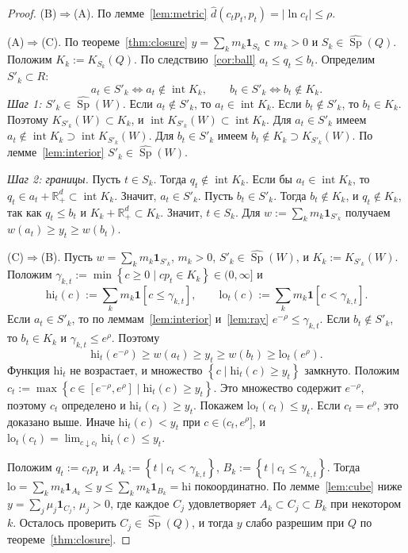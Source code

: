 \documentclass[a4paper,11pt]{article}
\theoremstyle{plain}
\theoremstyle{definition}
\theoremstyle{remark}
\newcommand{\R}{\mathbb{R}}
\newcommand{\abs}[1]{\left\lvert #1 \right\rvert}
\newcommand{\set}[1]{\left\{ #1 \right\}}
\newcommand{\Rp}[1][2]{\R^{#1}_{+}}   %
\DeclareMathOperator{\Sp}{Sp}
\DeclareMathOperator{\interior}{int}
\newcommand{\dd}{\widehat d}
\begin{document}
\begin{proof}
    (B)$\Rightarrow$(A). По лемме~\ref{lem:metric} $\dd(c_tp_t,p_t)=\abs{\ln c_t}\le\rho$.

    (A)$\Rightarrow$(C). По теореме~\ref{thm:closure} $y=\sum_km_k\mathbf 1_{S_k}$ с $m_k>0$ и $S_k\in\widehat{\Sp}(Q)$. Положим $K_k:=K_{S_k}(Q)$. По следствию~\ref{cor:ball} $a_t\le q_t\le b_t$. Определим $S'_k\subset R$:
    \[
        a_t\in S'_k\iff a_t\notin\interior K_k,\qquad b_t\in S'_k\iff b_t\notin K_k.
    \]
    \emph{Шаг 1: $S'_k\in\widehat{\Sp}(W)$.} Если $a_t\notin S'_k$, то $a_t\in\interior K_k$. Если $b_t\notin S'_k$, то $b_t\in K_k$. Поэтому $K_{S'_k}(W)\subset K_k$, и $\interior K_{S'_k}(W)\subset\interior K_k$. Для $a_t\in S'_k$ имеем $a_t\notin\interior K_k\supset\interior K_{S'_k}(W)$. Для $b_t\in S'_k$ имеем $b_t\notin K_k\supset K_{S'_k}(W)$. По лемме~\ref{lem:interior} $S'_k\in\widehat{\Sp}(W)$.

    \emph{Шаг 2: границы.} Пусть $t\in S_k$. Тогда $q_t\notin\interior K_k$. Если бы $a_t\in\interior K_k$, то $q_t\in a_t+\Rp[d]\subset\interior K_k$. Значит, $a_t\in S'_k$. Пусть $b_t\in S'_k$. Тогда $b_t\notin K_k$, и $q_t\notin K_k$, так как $q_t\le b_t$ и $K_k+\Rp[d]\subset K_k$. Значит, $t\in S_k$. Для $w:=\sum_km_k\mathbf 1_{S'_k}$ получаем $w(a_t)\ge y_t\ge w(b_t)$.

    (C)$\Rightarrow$(B). Пусть $w=\sum_km_k\mathbf 1_{S'_k}$, $m_k>0$, $S'_k\in\widehat{\Sp}(W)$, и $K_k:=K_{S'_k}(W)$. Положим $\gamma_{k,t}:=\min\set{c\ge0\mid cp_t\in K_k}\in(0,\infty]$ и
    \[
        \mathrm{hi}_t(c):=\sum_km_k\mathbf 1[c\le\gamma_{k,t}],\qquad\mathrm{lo}_t(c):=\sum_km_k\mathbf 1[c<\gamma_{k,t}].
    \]
    Если $a_t\in S'_k$, то по леммам~\ref{lem:interior} и~\ref{lem:ray} $e^{-\rho}\le\gamma_{k,t}$. Если $b_t\notin S'_k$, то $b_t\in K_k$ и $\gamma_{k,t}\le e^{\rho}$. Поэтому
    \[
        \mathrm{hi}_t(e^{-\rho})\ge w(a_t)\ge y_t\ge w(b_t)\ge\mathrm{lo}_t(e^{\rho}).
    \]
    Функция $\mathrm{hi}_t$ не возрастает, и множество $\set{c\mid\mathrm{hi}_t(c)\ge y_t}$ замкнуто. Положим $c_t:=\max\set{c\in[e^{-\rho},e^{\rho}]\mid\mathrm{hi}_t(c)\ge y_t}$. Это множество содержит $e^{-\rho}$, поэтому $c_t$ определено и $\mathrm{hi}_t(c_t)\ge y_t$. Покажем $\mathrm{lo}_t(c_t)\le y_t$. Если $c_t=e^{\rho}$, это доказано выше. Иначе $\mathrm{hi}_t(c)<y_t$ при $c\in(c_t,e^{\rho}]$, и $\mathrm{lo}_t(c_t)=\lim_{c\downarrow c_t}\mathrm{hi}_t(c)\le y_t$.

    Положим $q_t:=c_tp_t$ и $A_k:=\set{t\mid c_t<\gamma_{k,t}}$, $B_k:=\set{t\mid c_t\le\gamma_{k,t}}$. Тогда $\mathrm{lo}=\sum_km_k\mathbf 1_{A_k}\le y\le\sum_km_k\mathbf 1_{B_k}=\mathrm{hi}$ покоординатно. По лемме~\ref{lem:cube} ниже $y=\sum_j\mu_j\mathbf 1_{C_j}$, $\mu_j>0$, где каждое $C_j$ удовлетворяет $A_k\subset C_j\subset B_k$ при некотором $k$. Осталось проверить $C_j\in\widehat{\Sp}(Q)$, и тогда $y$ слабо разрешим при $Q$ по теореме~\ref{thm:closure}.


\end{proof}
\end{document}
